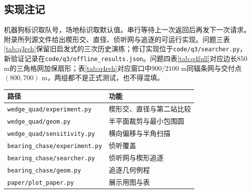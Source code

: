 \documentclass{cumcmthesis}
\begin{document}
\subsection{实现注记}

机器狗标识取队号，场地标识取默认值。串行等待上一次返回后再发下一次请求。附录所列源文件给出楔形交、直径、侦听网与追逐的可运行实现。问题三表\ref{tab:q3reh}保留旧启发式的三次历史演练；修订实现位于\texttt{code/q3/searcher.py}，新验证记录在\texttt{code/q3/offline\_results.json}。问题四表\ref{tab:q4full}对应边长$850$ m的三角格网加保扇形；表\ref{tab:q4reh}对应窗口中$900/2100$ m同辐条网与交付点$(800,700)$ m，两组都不是正式测试，也不得混填。

{\small
\begin{tabular}{ll}
\toprule
路径 & 功能 \\
\midrule
\texttt{wedge\_quad/experiment.py} & 楔形交、直径与第二站比较 \\
\texttt{wedge\_quad/geom.py} & 半平面裁剪与最小包围圆 \\
\texttt{wedge\_quad/sensitivity.py} & 横向偏移与半角扫描 \\
\texttt{bearing\_chase/experiment.py} & 侦听覆盖 \\
\texttt{bearing\_chase/searcher.py} & 侦听网与楔形追逐 \\
\texttt{bearing\_chase/geom.py} & 追逐几何例程 \\
\texttt{paper/plot\_paper.py} & 展示用图与表 \\
\bottomrule
\end{tabular}
}
\end{document}
